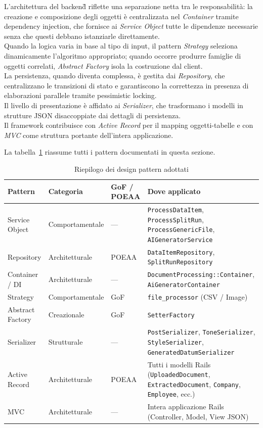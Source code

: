 \documentclass[a4paper,11pt]{article}
\newcommand{\code}[1]{\texttt{#1}}
\begin{document}
L'architettura del backend\G{} riflette una separazione netta tra le
responsabilità: la creazione e composizione degli oggetti è centralizzata
nel \textit{Container} tramite dependency injection, che fornisce ai
\textit{Service Object} tutte le dipendenze necessarie senza che questi
debbano istanziarle direttamente. \\
Quando la logica varia in base al tipo
di input, il pattern \textit{Strategy} seleziona dinamicamente l'algoritmo
appropriato; quando occorre produrre famiglie di oggetti correlati,
\textit{Abstract Factory} isola la costruzione dal client.\\
La persistenza, quando diventa complessa, è gestita dai \textit{Repository}, che centralizzano
le transizioni di stato e garantiscono la correttezza in presenza di
elaborazioni parallele tramite pessimistic locking.\\
Il livello di presentazione è affidato ai \textit{Serializer}, che
trasformano i modelli in strutture JSON disaccoppiate dai dettagli di
persistenza.\\
Il framework contribuisce con \textit{Active Record} per il mapping
oggetti-tabelle e con \textit{MVC} come struttura portante dell'intera
applicazione.

\bigskip

\noindent La tabella~\ref{tab:pattern_riepilogo} riassume tutti i pattern
documentati in questa sezione.

\begin{table}[H]
\centering
\small
\renewcommand{\arraystretch}{1.3}
\begin{tabularx}{\textwidth}{lllX}
\toprule
\textbf{Pattern} & \textbf{Categoria} & \textbf{GoF / POEAA} & \textbf{Dove applicato} \\
\midrule
Service Object      & Comportamentale & ---      & \code{ProcessDataItem}, \code{ProcessSplitRun}, \code{ProcessGenericFile}, \code{AIGeneratorService} \\
Repository          & Architetturale  & POEAA    & \code{DataItemRepository}, \code{SplitRunRepository} \\
Container / DI      & Architetturale  & ---      & \code{DocumentProcessing::Container}, \code{AiGeneratorContainer} \\
Strategy            & Comportamentale & GoF      & \code{file\_processor} (CSV / Image) \\
Abstract Factory    & Creazionale     & GoF      & \code{SetterFactory} \\
Serializer          & Strutturale     & ---      & \code{PostSerializer}, \code{ToneSerializer}, \code{StyleSerializer}, \code{GeneratedDatumSerializer} \\
Active Record       & Architetturale  & POEAA    & Tutti i modelli Rails (\code{UploadedDocument}, \code{ExtractedDocument}, \code{Company}, \code{Employee}, ecc.) \\
MVC                 & Architetturale  & ---      & Intera applicazione Rails (Controller, Model, View JSON) \\
\bottomrule
\end{tabularx}
\caption{Riepilogo dei design pattern adottati}
\label{tab:pattern_riepilogo}
\end{table}
\end{document}
